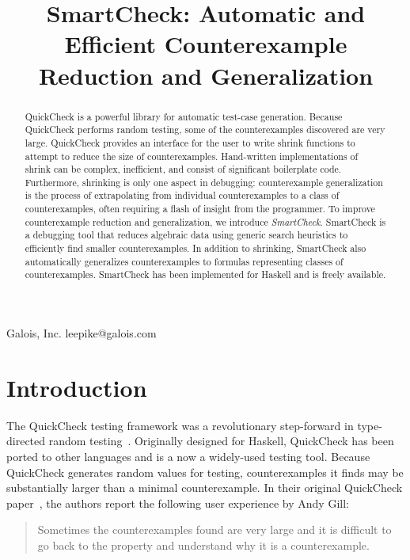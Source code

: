 \documentclass{sigplanconf}
\begin{document}
\newcommand{\xmonad}{\textsc{xmonad}}



\title{SmartCheck: Automatic and Efficient Counterexample Reduction and Generalization}

           {Galois, Inc.}
           {leepike@galois.com}
\maketitle

\begin{abstract}
QuickCheck is a powerful library for automatic test-case generation.  Because
QuickCheck performs random testing, some of the counterexamples discovered are
very large.  QuickCheck provides an interface for the user to write shrink
functions to attempt to reduce the size of counterexamples.  Hand-written
implementations of shrink can be complex, inefficient, and consist of
significant boilerplate code.  Furthermore, shrinking is only one aspect in
debugging: counterexample generalization is the process of extrapolating from
individual counterexamples to a class of counterexamples, often requiring a
flash of insight from the programmer.  To improve counterexample reduction and
generalization, we introduce \emph{SmartCheck}.  SmartCheck is a debugging tool
that reduces algebraic data using generic search heuristics to efficiently find
smaller counterexamples.  In addition to shrinking, SmartCheck also
automatically generalizes counterexamples to formulas representing classes of
counterexamples.  SmartCheck has been implemented for Haskell and is freely
available.
\end{abstract}




\section{Introduction}\label{sec:intro}
The QuickCheck testing framework was a revolutionary step-forward in
type-directed random testing~\cite{qc,monadic}.  Originally designed for Haskell,
QuickCheck has been ported to other languages and is a now a widely-used testing
tool.  Because QuickCheck generates random values for testing, counterexamples
it finds may be substantially larger than a minimal counterexample.  In their
original QuickCheck paper~\cite{qc}, the authors report the following user
experience by Andy Gill:
%
\begin{quote}
Sometimes the counterexamples found are very large and it is difficult to go
back to the property and understand why it is a counterexample.
\end{quote}
\end{document}
